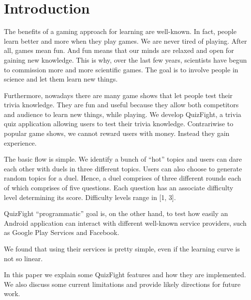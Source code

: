 \section{Introduction}

The benefits of a gaming approach for learning are well-known. In fact,
people learn better and more when they play games. We are never tired of
playing.
After all, games mean fun. And fun means that our minds are relaxed and open
for gaining new knowledge.
This is why, over the last few years, scientists have begun to commission
more and more scientific games.
The goal is to involve people in science and let them learn new things.

Furthermore, nowadays there are many game shows that let people test their
trivia knowledge.
They are fun and useful because they allow both competitors and audience to
learn new things, while playing.
We develop QuizFight, a trivia quiz application allowing users to test their
trivia knowledge.
Contrariwise to popular game shows, we cannot reward users with money.
Instead they gain experience. 

The basic flow is simple. We identify a bunch of ``hot'' topics and users can
dare each other with duels in three different topics.
Users can also choose to generate random topics for a duel.
Hence, a duel comprises of three different rounds each of which comprises
of five questions.
Each question has an associate difficulty level determining its score.
Difficulty levels range in [1, 3].

QuizFight ``programmatic'' goal is, on the other hand, to test how easily an
Android application can interact with different well-known service providers,
such as Google Play Services and Facebook.

We found that using their services is pretty simple, even if the learning curve
is not so linear.

In this paper we explain some QuizFight features and how they are
implemented.
We also discuss some current limitations and provide likely directions for
future work. 


